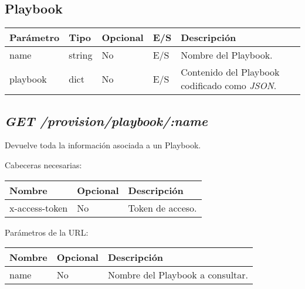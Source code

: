 	\subsection{Playbook}
	\label{sec:playbook}
		\begin{table}[h!]
			\centering
	\begin{adjustbox}{max width=\textwidth}
			\begin{tabularx}{\linewidth}{|l|l|l|l|L|}
				\hline
				Parámetro & Tipo & Opcional & E/S & Descripción \\ \hline
				name & string & No & E/S & Nombre del Playbook. \\ \hline
				playbook & dict & No & E/S & Contenido del Playbook codificado como \textit{JSON}. \\ \hline
			\end{tabularx}
\end{adjustbox}
		\end{table}
	
	\subsection{\textit{GET /provision/playbook/:name}}
		Devuelve toda la información asociada a un Playbook.
		
		Cabeceras necesarias:
		\begin{table}[h!]
			\centering
	\begin{adjustbox}{max width=\textwidth}
			\begin{tabular}{|l|l|l|}
				\hline
				Nombre & Opcional & Descripción \\ \hline
				x-access-token & No & Token de acceso. \\ \hline
			\end{tabular}
\end{adjustbox}
		\end{table}
		
		Parámetros de la URL:
		\begin{table}[h!]
			\centering
	\begin{adjustbox}{max width=\textwidth}
			\begin{tabular}{|l|l|l|}
				\hline
				Nombre & Opcional & Descripción \\ \hline
				name & No & Nombre del Playbook a consultar. \\ \hline
			\end{tabular}
\end{adjustbox}
		\end{table}
		
